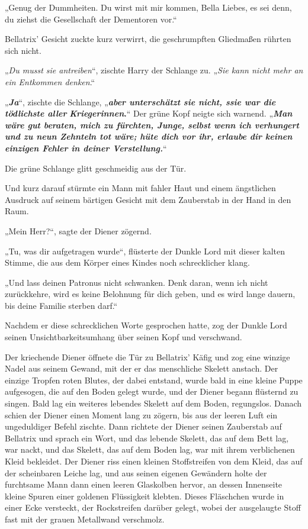 {„Genug der Dummheiten. Du wirst mit mir kommen, Bella Liebes, es sei denn, du ziehst die Gesellschaft der Dementoren vor.“

Bellatrix' Gesicht zuckte kurz verwirrt, die geschrumpften Gliedmaßen rührten sich nicht.

„\emph{Du musst sie antreiben}“, zischte Harry der Schlange zu. „\emph{Sie kann nicht mehr an ein Entkommen denken}.“

„\textbf{\emph{Ja}}“, zischte die Schlange, „\textbf{\emph{aber unterschätzt sie nicht, ssie war die tödlichste aller}} \textbf{\emph{Kriegerinnen}.}“ Der grüne Kopf neigte sich warnend. „\textbf{\emph{Man wäre gut beraten, mich zu fürchten, Junge, selbst wenn ich verhungert und zu neun Zehnteln tot wäre; hüte dich vor ihr, erlaube dir keinen einzigen Fehler in deiner Verstellung.}}“

Die grüne Schlange glitt geschmeidig aus der Tür.

Und kurz darauf stürmte ein Mann mit fahler Haut und einem ängstlichen Ausdruck auf seinem bärtigen Gesicht mit dem Zauberstab in der Hand in den Raum.

„Mein Herr?“, sagte der Diener zögernd.

„Tu, was dir aufgetragen wurde“, flüsterte der Dunkle Lord mit dieser kalten Stimme, die aus dem Körper eines Kindes noch schrecklicher klang.

„Und lass deinen Patronus nicht schwanken. Denk daran, wenn ich nicht zurückkehre, wird es keine Belohnung für dich geben, und es wird lange dauern, bis deine Familie sterben darf.“

Nachdem er diese schrecklichen Worte gesprochen hatte, zog der Dunkle Lord seinen Unsichtbarkeitsumhang über seinen Kopf und verschwand.

Der kriechende Diener öffnete die Tür zu Bellatrix' Käfig und zog eine winzige Nadel aus seinem Gewand, mit der er das menschliche Skelett anstach. Der einzige Tropfen roten Blutes, der dabei entstand, wurde bald in eine kleine Puppe aufgesogen, die auf den Boden gelegt wurde, und der Diener begann flüsternd zu singen. Bald lag ein weiteres lebendes Skelett auf dem Boden, regungslos. Danach schien der Diener einen Moment lang zu zögern, bis aus der leeren Luft ein ungeduldiger Befehl zischte. Dann richtete der Diener seinen Zauberstab auf Bellatrix und sprach ein Wort, und das lebende Skelett, das auf dem Bett lag, war nackt, und das Skelett, das auf dem Boden lag, war mit ihrem verblichenen Kleid bekleidet. Der Diener riss einen kleinen Stoffstreifen von dem Kleid, das auf der scheinbaren Leiche lag, und aus seinen eigenen Gewändern holte der furchtsame Mann dann einen leeren Glaskolben hervor, an dessen Innenseite kleine Spuren einer goldenen Flüssigkeit klebten. Dieses Fläschchen wurde in einer Ecke versteckt, der Rockstreifen darüber gelegt, wobei der ausgelaugte Stoff fast mit der grauen Metallwand verschmolz.

}
